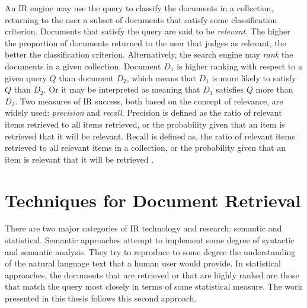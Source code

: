 An IR engine may use the query to classify the documents in a collection, returning to the user a subset of documents that satisfy some classification criterion. Documents that satisfy the query are said to be \textit{relevant}. The higher the proportion of documents returned to the user that judges as relevant, the better the classification criterion. Alternatively, the search engine may \textit{rank} the documents in a given collection. Document $D_1$ is higher ranking with respect to a given query $Q$ than document $D_2$, which means that $D_1$ is more likely to satisfy $Q$ than $D_2$. Or it may be interpreted as meaning that $D_1$ satisfies $Q$ more than $D_2$. Two measures of IR success, both based on the concept of relevance, are widely used: \textit{precision} and \textit{recall}. Precision is defined as the ratio of relevant items retrieved to all items retrieved, or the probability given that an item is retrieved that it will be relevant. Recall is defined as, the ratio of relevant items retrieved to all relevant items in a collection, or the probability given that an item is relevant that it will be retrieved \citep{saracevic1995}.

\section{Techniques for Document Retrieval}\label{sec:related-work}

There are two major categories of IR technology and research: semantic and statistical. Semantic approaches attempt to implement some degree of syntactic and semantic analysis. They try to reproduce to some degree the understanding of the natural language text that a human user would provide. In statistical approaches, the documents that are retrieved or that are highly ranked are those that match the query most closely in terms of some statistical measure. The work presented in this thesis follows this second approach. 


